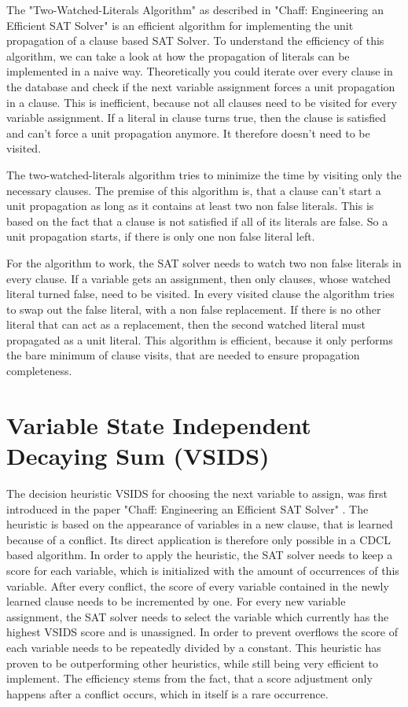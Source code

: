 The "Two-Watched-Literals Algorithm" as described in "Chaff: Engineering an Efficient SAT Solver" \cite{moskewicz2001chaff} is an efficient algorithm for implementing the unit propagation of a clause based SAT Solver. To understand the efficiency of this algorithm, we can take a look at how the propagation of literals can be implemented in a naive way. Theoretically you could iterate over every clause in the database and check if the next variable assignment forces a unit propagation in a clause. This is inefficient, because not all clauses need to be visited for every variable assignment. If a literal in clause turns true, then the clause is satisfied and can't force a unit propagation anymore. It therefore doesn't need to be visited.

The two-watched-literals algorithm tries to minimize the time by visiting only the necessary clauses. The premise of this algorithm is, that a clause can't start a unit propagation as long as it contains at least two non false literals. This is based on the fact that a clause is not satisfied if all of its literals are false. So a unit propagation starts, if there is only one non false literal left.

For the algorithm to work, the SAT solver needs to watch two non false literals in every clause. If a variable gets an assignment, then only clauses, whose watched literal turned false, need to be visited. In every visited clause the algorithm tries to swap out the false literal, with a non false replacement. If there is no other literal that can act as a replacement, then the second watched literal must propagated as a unit literal. This algorithm is efficient, because it only performs the bare minimum of clause visits, that are needed to ensure propagation completeness.

\section{Variable State Independent Decaying Sum (VSIDS)}
\label{sec:VSIDS}

The decision heuristic VSIDS for choosing the next variable to assign, was first introduced in the paper "Chaff: Engineering an Efficient SAT Solver" \cite{moskewicz2001chaff}. The heuristic is based on the appearance of variables in a new clause, that is learned because of a conflict. Its direct application is therefore only possible in a CDCL based algorithm. In order to apply the heuristic, the SAT solver needs to keep a score for each variable, which is initialized with the amount of occurrences of this variable. After every conflict, the score of every variable contained in the newly learned clause needs to be incremented by one. For every new variable assignment, the SAT solver needs to select the variable which currently has the highest VSIDS score and is unassigned. In order to prevent overflows the score of each variable needs to be repeatedly divided by a constant. This heuristic has proven to be outperforming other heuristics, while still being very efficient to implement. The efficiency stems from the fact, that a score adjustment only happens after a conflict occurs, which in itself is a rare occurrence.

